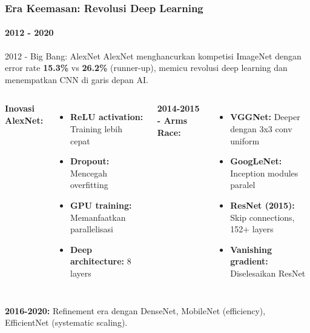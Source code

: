 \documentclass[t,aspectratio=169,xcolor=dvipsnames]{beamer}
\begin{document}
\begin{frame}
    \frametitle{Era Keemasan: Revolusi Deep Learning}
    \framesubtitle{2012 - 2020}
    \footnotesize

    \begin{exampleblock}{2012 - Big Bang: AlexNet}
        AlexNet menghancurkan kompetisi ImageNet dengan error rate \textbf{15.3\%} vs \textbf{26.2\%} (runner-up), memicu revolusi deep learning dan menempatkan CNN di garis depan AI.
    \end{exampleblock}

    \begin{columns}[t]
        \textbf{Inovasi AlexNet:}
        \begin{itemize}
            \item \textbf{ReLU activation:} Training lebih cepat
            \item \textbf{Dropout:} Mencegah overfitting
            \item \textbf{GPU training:} Memanfaatkan parallelisasi
            \item \textbf{Deep architecture:} 8 layers
        \end{itemize}

        \textbf{2014-2015 - Arms Race:}
        \begin{itemize}
            \item \textbf{VGGNet:} Deeper dengan 3x3 conv uniform
            \item \textbf{GoogLeNet:} Inception modules paralel
            \item \textbf{ResNet (2015):} Skip connections, 152+ layers
            \item \textbf{Vanishing gradient:} Diselesaikan ResNet
        \end{itemize}
    \end{columns}
    \vspace{0.3cm}
    \textbf{2016-2020:} Refinement era dengan DenseNet, MobileNet (efficiency), EfficientNet (systematic scaling).
\end{frame}
\end{document}
